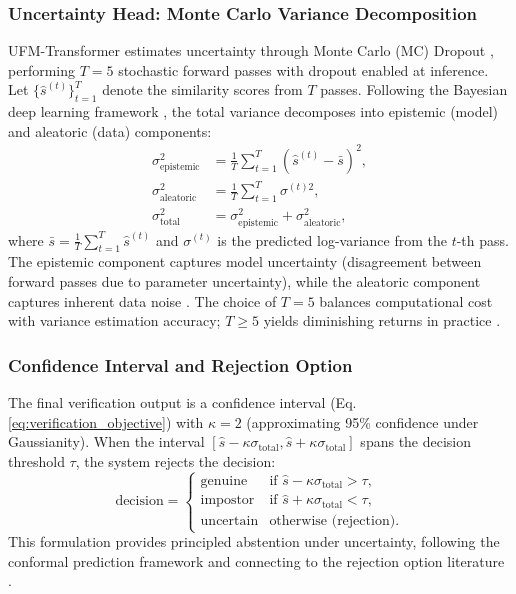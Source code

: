 \documentclass[10pt,journal,compsoc]{IEEEtran}
\begin{document}
\subsubsection{Uncertainty Head: Monte Carlo Variance Decomposition}

UFM-Transformer estimates uncertainty through Monte Carlo (MC) Dropout \cite{gal2016dropout}, performing $T = 5$ stochastic forward passes with dropout enabled at inference. Let $\{\hat{s}^{(t)}\}_{t=1}^{T}$ denote the similarity scores from $T$ passes. Following the Bayesian deep learning framework \cite{kendall2017uncertainties}, the total variance decomposes into epistemic (model) and aleatoric (data) components:
\begin{align}
\label{eq:variance_decomposition}
\sigma_{\text{epistemic}}^2 &= \frac{1}{T} \sum_{t=1}^{T} \left(\hat{s}^{(t)} - \bar{s}\right)^2, \\
\sigma_{\text{aleatoric}}^2 &= \frac{1}{T} \sum_{t=1}^{T} \sigma^{(t)2}, \\
\sigma_{\text{total}}^2 &= \sigma_{\text{epistemic}}^2 + \sigma_{\text{aleatoric}}^2,
\end{align}
where $\bar{s} = \frac{1}{T}\sum_{t=1}^{T} \hat{s}^{(t)}$ and $\sigma^{(t)}$ is the predicted log-variance from the $t$-th pass. The epistemic component captures model uncertainty (disagreement between forward passes due to parameter uncertainty), while the aleatoric component captures inherent data noise \cite{kendall2017uncertainties}. The choice of $T = 5$ balances computational cost with variance estimation accuracy; $T \geq 5$ yields diminishing returns in practice \cite{gal2016dropout}.

\subsubsection{Confidence Interval and Rejection Option}

The final verification output is a confidence interval (Eq. \ref{eq:verification_objective}) with $\kappa = 2$ (approximating 95\% confidence under Gaussianity). When the interval $[\hat{s} - \kappa\sigma_{\text{total}}, \hat{s} + \kappa\sigma_{\text{total}}]$ spans the decision threshold $\tau$, the system rejects the decision:
\begin{equation}
\label{eq:rejection}
\text{decision} = \begin{cases}
\text{genuine} & \text{if } \hat{s} - \kappa\sigma_{\text{total}} > \tau, \\
\text{impostor} & \text{if } \hat{s} + \kappa\sigma_{\text{total}} < \tau, \\
\text{uncertain} & \text{otherwise (rejection)}.
\end{cases}
\end{equation}
This formulation provides principled abstention under uncertainty, following the conformal prediction framework \cite{balomenos2018automatic} and connecting to the rejection option literature \cite{chow1970optimum}.
\end{document}
